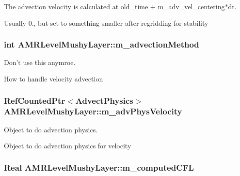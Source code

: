 The advection velocity is calculated at old\-\_\-time + m\-\_\-adv\-\_\-vel\-\_\-centering$\ast$dt. 

Usually 0., but set to something smaller after regridding for stability \hypertarget{class_a_m_r_level_mushy_layer_a5304e0c78e438aea19acb6f3702e5243}{
\subsubsection[{m\-\_\-advection\-Method}]{\setlength{\rightskip}{0pt plus 5cm}int A\-M\-R\-Level\-Mushy\-Layer\-::m\-\_\-advection\-Method\hspace{0.3cm}{\ttfamily [protected]}}}\label{class_a_m_r_level_mushy_layer_a5304e0c78e438aea19acb6f3702e5243}


Don't use this anymroe. 

How to handle velocity advection \hypertarget{class_a_m_r_level_mushy_layer_acc7b64a985eeb8434eff80c393733c1f}{
\subsubsection[{m\-\_\-adv\-Phys\-Velocity}]{\setlength{\rightskip}{0pt plus 5cm}Ref\-Counted\-Ptr$<$Advect\-Physics$>$ A\-M\-R\-Level\-Mushy\-Layer\-::m\-\_\-adv\-Phys\-Velocity\hspace{0.3cm}{\ttfamily [protected]}}}\label{class_a_m_r_level_mushy_layer_acc7b64a985eeb8434eff80c393733c1f}


Object to do advection physics. 

Object to do advection physics for velocity \hypertarget{class_a_m_r_level_mushy_layer_aa7a6e8a5cb2cb6f690c047e46d70547f}{
\subsubsection[{m\-\_\-computed\-C\-F\-L}]{\setlength{\rightskip}{0pt plus 5cm}Real A\-M\-R\-Level\-Mushy\-Layer\-::m\-\_\-computed\-C\-F\-L\hspace{0.3cm}{\ttfamily [protected]}}}\label{class_a_m_r_level_mushy_layer_aa7a6e8a5cb2cb6f690c047e46d70547f}


